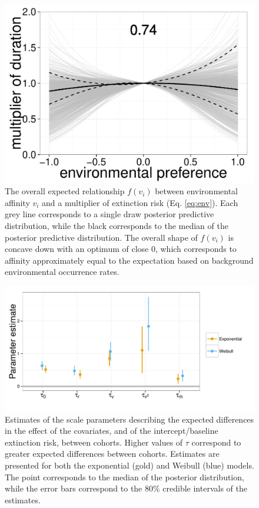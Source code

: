 \documentclass[12pt,letterpaper]{article}
\begin{document}
\begin{figure}[ht]
  \centering
  \includegraphics[height = 0.5\textheight,width=\textwidth,keepaspectratio=true]{figure/environ_quad}
  \caption{The overall expected relationship \(f(v_{i})\) between environmental affinity \(v_{i}\) and a multiplier of extinction risk (Eq. \ref{eq:env}). Each grey line corresponds to a single draw posterior predictive distribution, while the black corresponds to the median of the posterior predictive distribution. The overall shape of \(f(v_{i})\) is concave down with an optimum of close 0, which corresponds to affinity approximately equal to the expectation based on background environmental occurrence rates.}
  \label{fig:env_mean}
\end{figure}

\begin{figure}[ht]
  \centering
  \includegraphics[height = 0.5\textheight,width=\textwidth,keepaspectratio=true]{figure/coef_var}
  \caption{Estimates of the scale parameters describing the expected differences in the effect of the covariates, and of the intercept/baseline extinction risk, between cohorts. Higher values of \(\tau\) correspond to greater expected differences between cohorts. Estimates are presented for both the exponential (gold) and Weibull (blue) models. The point corresponds to the median of the posterior distribution, while the error bars correspond to the 80\% credible intervals of the estimates.}
  \label{fig:tau}
\end{figure}
\end{document}
